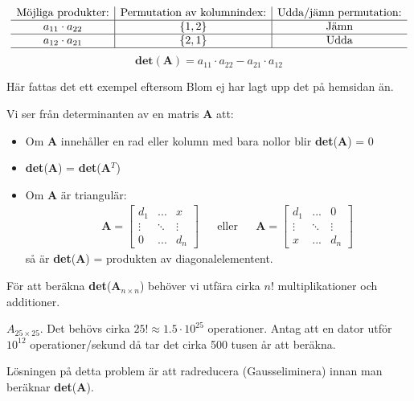 \[
\begin{array}{c|c|c}
	\mbox{Möjliga produkter:} & \mbox{Permutation av kolumnindex:} & \mbox{Udda/jämn permutation:}\\\hline
	a_{11} \cdot a_{22} & \{1,2\} & \mbox{Jämn} \\\hline
	a_{12} \cdot a_{21} & \{2,1\} & \mbox{Udda}\\\hline
\end{array}
\]
\[
    \mathbf{det}(\mathbf{A}) = a_{11} \cdot a_{22} - a_{21} \cdot a_{12}
\]
\begin{Ex}
    \begin{center}
    	Här fattas det ett exempel eftersom Blom ej har lagt upp det på hemsidan än.	
    \end{center}
\end{Ex}
Vi ser från determinanten av en matris \textbf{A} att:
\begin{itemize}
	\item Om \textbf{A} innehåller en rad eller kolumn med bara nollor blir \textbf{det}(\textbf{A}) = 0
	\item \textbf{det}(\textbf{A}) = \textbf{det}(\textbf{A}$^T$)
	\item Om \textbf{A} är triangulär:
	\begin{align*}
	&&	\mathbf{A} = 
	    \begin{bmatrix}
	    d_1 & ... & x\\
	    \vdots & \ddots & \vdots\\
	    0 & ... & d_n
	    \end{bmatrix}
	&&\mbox{eller}
	&& 	\mathbf{A} = 
	    \begin{bmatrix}
	    d_1 & ... & 0\\
	    \vdots & \ddots & \vdots\\
	    x & ... & d_n
	    \end{bmatrix}
	\end{align*}
	så är \textbf{det}(\textbf{A}) = produkten av diagonalelementent.
\end{itemize}
För att beräkna \textbf{det}(\textbf{A}$_{n \times n}$) behöver vi utfära cirka $n!$ multiplikationer och additioner.
\begin{Ex}
    $A_{25 \times 25}$. Det behövs cirka $25! \approx 1.5 \cdot 10^{25}$ operationer. Antag att en dator utför $10^{12}$ operationer/sekund då tar det cirka 500 tusen år att beräkna.
\end{Ex}
Lösningen på detta problem är att radreducera (Gausseliminera) innan man beräknar \textbf{det}(\textbf{A}).\\
